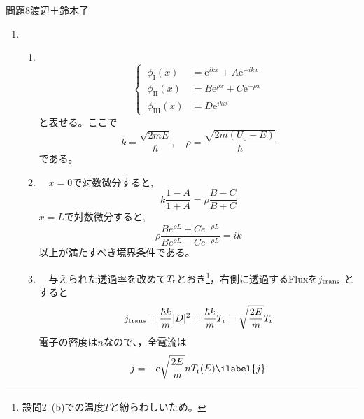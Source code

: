 \documentclass[fleqn]{jbook}
\begin{document}

\begin{answer}{問題8}{渡辺＋鈴木了}
\setcounter{equation}{0}


\begin{enumerate}

  \item 　
  
  \begin{enumerate}
  
    \item 　
\begin{equation}
\begin{cases}
       ~\phi_\mathrm{I}(x) & = \mathrm{e}^{i kx} + A \mathrm{e}^{-i kx} \\
       ~\phi_\mathrm{II}(x) & = B \mathrm{e}^{\rho x} + C \mathrm{e}^{ - \rho x} \\
       ~\phi_\mathrm{III}(x) & = D \mathrm{e}^{i kx} 
\end{cases}
\end{equation}
と表せる。ここで
\begin{equation}
k = \frac{\sqrt {2mE}}{\hbar} , \quad \rho = \frac{\sqrt {2m(U_0-E)}}{\hbar}\nonumber
\end{equation}
である。\\
    
    \item 　$x=0$で対数微分すると,
\begin{equation}
k\frac{1-A}{1+A} = \rho\frac{B-C}{B+C}
\end{equation}
$x=L$で対数微分すると,
\begin{equation}
\rho\frac{Be^{\rho L}+Ce^{-\rho L}}{Be^{\rho L}-Ce^{-\rho L}} = i k
\end{equation}
以上が満たすべき境界条件である。\\

    \item 　与えられた透過率を改めて$T_{\rm r}$とおき\footnote{設問2~(b)での温度$T$と紛らわしいため。}，右側に透過するFluxを$j_{\rm trans}$ とすると
\begin{equation*}
j_{\rm trans} = \frac{\hbar k}{m}|D|^2 = \frac{\hbar k}{m}T_{\rm r} = \sqrt{\frac{2E}{m}}T_{\rm r}
\end{equation*}
電子の密度は$n$なので、，全電流は
\begin{equation}
j = - e \sqrt{\frac{2E}{m}}nT_{\rm r}(E) \ilabel{j}
\end{equation}
    

\end{enumerate}
\end{enumerate}
\end{answer}
\end{document}
